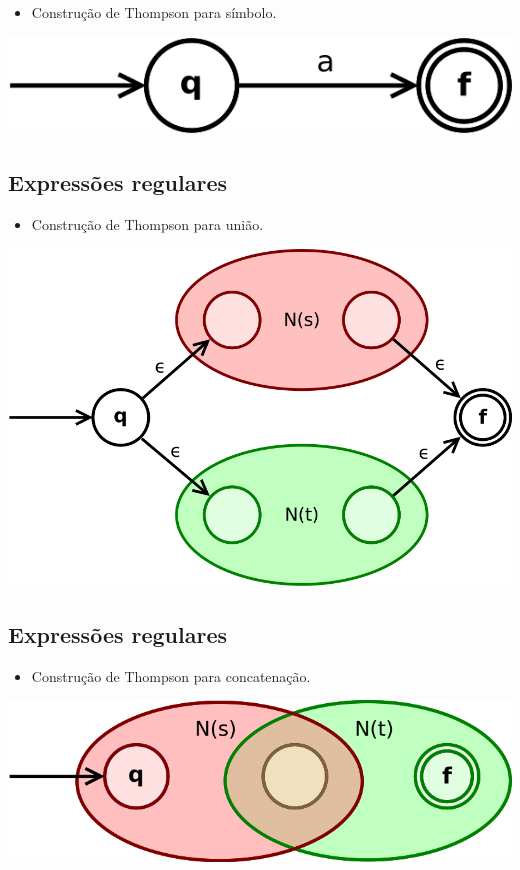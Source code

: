 \documentclass[11pt]{article}
\begin{document}
\begin{itemize}
\item Construção de Thompson para símbolo.
\end{itemize}

\begin{center}
\includegraphics[width=.9\linewidth]{./Thompson-a-symbol.png}
\end{center}
\subsection*{Expressões regulares}
\label{sec:orgb7c03b1}

\begin{itemize}
\item Construção de Thompson para união.
\end{itemize}
\begin{center}
\includegraphics[width=.9\linewidth]{./Thompson-or.png}
\end{center}
\subsection*{Expressões regulares}
\label{sec:org7c46dc8}

\begin{itemize}
\item Construção de Thompson para concatenação.
\end{itemize}

\begin{center}
\includegraphics[width=.9\linewidth]{./Thompson-concat.png}
\end{center}
\end{document}
